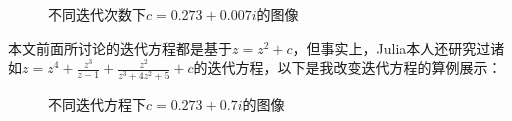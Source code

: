 \documentclass{ctexart}
\begin{document}
\begin{figure}[H]
	\centering
	\caption{不同迭代次数下$c=0.273+0.007i$的图像}
\end{figure}
本文前面所讨论的迭代方程都是基于$z=z^2+c$，但事实上，Julia本人还研究过诸如$z=z^{4}+\frac{z^{3}}{z-1}+\frac{z^{2}}{z^{3}+4 z^{2}+5}+c$的迭代方程，以下是我改变迭代方程的算例展示：
\begin{figure}[H]
	\centering
	\caption{不同迭代方程下$c=0.273+0.7i$的图像}
\end{figure}
\end{document}
